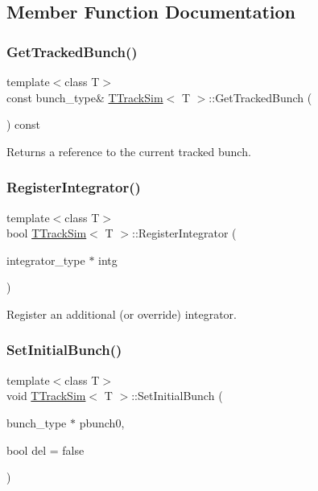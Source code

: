 \subsection{Member Function Documentation}
\mbox{\label{classTTrackSim_a1166829409899f10dbd9a2ce4f703277}} 
\subsubsection{\texorpdfstring{Get\+Tracked\+Bunch()}{GetTrackedBunch()}}
{\footnotesize\ttfamily template$<$class T$>$ \\
const bunch\+\_\+type\& \hyperlink{classTTrackSim}{T\+Track\+Sim}$<$ T $>$\+::Get\+Tracked\+Bunch (\begin{DoxyParamCaption}{ }\end{DoxyParamCaption}) const\hspace{0.3cm}{\ttfamily [inline]}}

Returns a reference to the current tracked bunch. \mbox{\label{classTTrackSim_aace94ccc4f443e3cbb6e113b60313ee2}} 
\subsubsection{\texorpdfstring{Register\+Integrator()}{RegisterIntegrator()}}
{\footnotesize\ttfamily template$<$class T$>$ \\
bool \hyperlink{classTTrackSim}{T\+Track\+Sim}$<$ T $>$\+::Register\+Integrator (\begin{DoxyParamCaption}\item[{integrator\+\_\+type $\ast$}]{intg }\end{DoxyParamCaption})\hspace{0.3cm}{\ttfamily [inline]}}

Register an additional (or override) integrator. \mbox{\label{classTTrackSim_abdc1a4fd2ed79de3879b1da485768a78}} 
\subsubsection{\texorpdfstring{Set\+Initial\+Bunch()}{SetInitialBunch()}}
{\footnotesize\ttfamily template$<$class T$>$ \\
void \hyperlink{classTTrackSim}{T\+Track\+Sim}$<$ T $>$\+::Set\+Initial\+Bunch (\begin{DoxyParamCaption}\item[{bunch\+\_\+type $\ast$}]{pbunch0,  }\item[{bool}]{del = {\ttfamily false} }\end{DoxyParamCaption})\hspace{0.3cm}{\ttfamily [inline]}}


